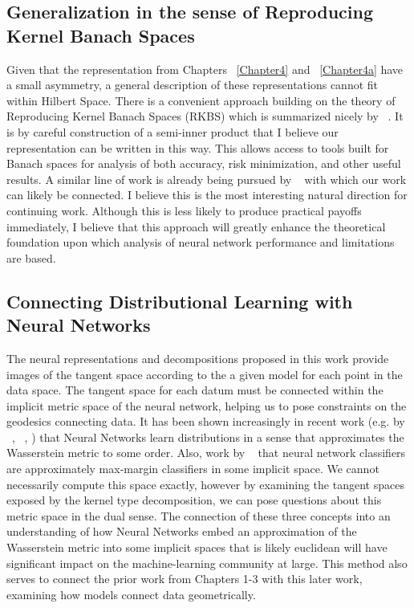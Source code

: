 \subsection{Generalization in the sense of Reproducing Kernel Banach Spaces}
Given that the representation from Chapters ~\ref{Chapter4} and
~\ref{Chapter4a} have a small asymmetry, a general description of
these representations cannot fit within Hilbert Space. There is a
convenient approach building on the theory of Reproducing Kernel
Banach Spaces (RKBS) which is summarized nicely by
~\citet{zhang2009reproducing}. It is by careful construction of a
semi-inner product that I believe our representation can be written in
this way. This allows access to tools built for Banach spaces for
analysis of both accuracy, risk minimization, and other useful
results. A similar line of work is already being pursued by
~\citet{shilton_gradient_2023} with which our work can likely be
connected. I believe this is the most interesting natural direction
for continuing work. Although this is less likely to produce practical
payoffs immediately, I believe that this approach will greatly enhance
the theoretical foundation upon which analysis of neural network
performance and limitations are based. 

\subsection{Connecting Distributional Learning with Neural Networks}

The neural representations and decompositions proposed in this work
provide images of the tangent space according to the
a given model for each point in the data space. The tangent space
for each datum must be connected within the implicit metric space of
the neural network, helping us to pose constraints on the geodesics
connecting data. It has been shown increasingly in recent work
(e.g. by  ~\citet{lu2020universal}, ~\citet{yang2022capacity}, \citet{altekruger_neural_2023}) that Neural Networks
learn distributions in a sense that approximates the Wasserstein
metric to some order. Also, work by ~\citet{chizat2020maxmargin} that neural network
classifiers are approximately max-margin classifiers in some
implicit space. We cannot necessarily compute this space exactly,
however by examining the tangent spaces exposed by the kernel type
decomposition, we can pose questions about this metric space in the
dual sense. The connection of these three concepts into an
understanding of how Neural Networks embed an approximation of the
Wasserstein metric into some implicit spaces that is likely
euclidean will have significant impact on the machine-learning
community at large. This method also serves to connect the prior
work from Chapters 1-3 with this later work, examining how models
connect data geometrically. 



